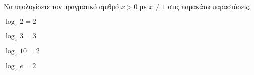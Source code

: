 Να υπολογίσετε τον πραγματικό αριθμό $ x>0 $ με $ x\neq 1 $ στις παρακάτω παραστάσεις.
\begin{multicols}{2}
\begin{rlist}
\item $ \log_{x}{2}=2 $
\item $ \log_{x}{3}=3 $
\item $ \log_{x}{10}=2 $
\item $ \log_{x}{e}=2 $
\end{rlist}
\end{multicols}
